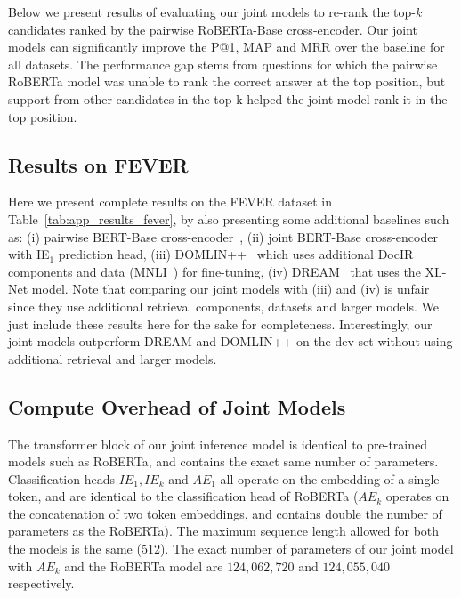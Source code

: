 Below we present results of evaluating our joint models to re-rank the top-$k$ candidates ranked by the pairwise RoBERTa-Base cross-encoder. Our joint models can significantly improve the P@1, MAP and MRR over the baseline for all datasets. The performance gap stems from questions for which the pairwise RoBERTa model was unable to rank the correct answer at the top position, but support from other candidates in the top-k helped the joint model rank it in the top position.


\subsection{Results on FEVER}
Here we present complete results on the FEVER dataset in Table~\ref{tab:app_results_fever}, by also presenting some additional baselines such as: (i) pairwise BERT-Base cross-encoder~\cite{tymoshenko-moschitti-2021-strong}, (ii) joint BERT-Base cross-encoder with IE$_1$ prediction head, (iii) DOMLIN++~\cite{Stammbach2020eFEVEREA} which uses additional DocIR components and data (MNLI~\cite{williams-etal-2018-broad}) for fine-tuning, (iv) DREAM~\cite{zhong-etal-2020-reasoning} that uses the XL-Net model. Note that comparing our joint models with (iii) and (iv) is unfair since they use additional retrieval components, datasets and larger models. We just include these results here for the sake for completeness. Interestingly, our joint models outperform DREAM and DOMLIN++ on the dev set without using additional retrieval and larger models. 

\subsection{Compute Overhead of Joint Models}
\label{app:number_params}

The transformer block of our joint inference model is identical to pre-trained models such as RoBERTa, and contains the exact same number of parameters. Classification heads $IE_1, IE_k$ and $AE_1$ all operate on the embedding of a single token, and are identical to the classification head of RoBERTa ($AE_k$ operates on the concatenation of two token embeddings, and contains double the number of parameters as the RoBERTa). The maximum sequence length allowed for both the models is the same (512). The exact number of parameters of our joint model with $AE_k$ and the RoBERTa model are $124,062,720$ and $124,055,040$ respectively.

